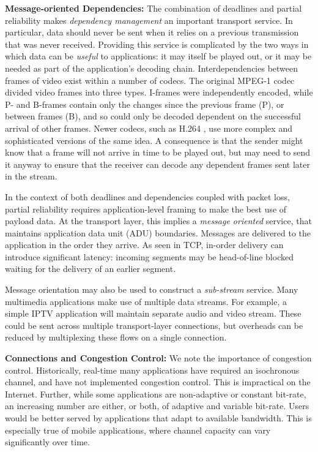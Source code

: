 \documentclass{sig-alternate-05-2015}
\begin{document}
\textbf{Message-oriented Dependencies:}
The combination of deadlines and partial reliability makes \emph{dependency
management} an important transport service.
In particular, data should never be sent when it relies on a previous
transmission that was never received. Providing this service is complicated by
the two ways in which data can be \emph{useful} to applications: it may itself
be played out, or it may be needed as part of the application's decoding chain.
Interdependencies between frames of video exist within a number of codecs.
The original MPEG-1 codec \cite{le1991mpeg} divided video frames into three
types. I-frames were independently encoded, while P- and B-frames contain
only the changes since the previous frame (P), or between frames (B), and so
could only be decoded dependent on the successful arrival of other frames.
Newer codecs, such as H.264 \cite{wiegand2003overview}, use more complex
and sophisticated versions of the same idea. 
A consequence is that the sender might know that a frame will not arrive in
time to be played out, but may need to send it anyway to ensure that the
receiver can decode any dependent frames sent later in the stream.

In the context of both deadlines and dependencies coupled with packet loss, partial reliability
requires application-level framing \cite{clark:1990:architecture} to
make the best use of payload data. At the transport
layer, this implies a \emph{message oriented} service, that
maintains application data unit (ADU) boundaries. Messages are delivered to
the application in the order they arrive. As seen in TCP, in-order delivery
can introduce significant latency: incoming segments may be head-of-line
blocked waiting for the delivery of an earlier segment.

Message orientation may also be used to construct a \emph{sub-stream} service.
Many multimedia applications make use of multiple data streams. For example, a
simple IPTV application will maintain separate audio and video stream. These
could be sent across multiple transport-layer connections, but overheads can be
reduced by multiplexing these flows on a single connection.

\textbf{Connections and Congestion Control:}
We note the importance of congestion control. Historically, real-time many
applications have required an isochronous channel, and have not implemented
congestion control. This is impractical on the Internet. Further, while
some applications are non-adaptive or constant bit-rate, an increasing
number are either, or both, of adaptive and variable bit-rate. Users would
be better served by applications that adapt to available bandwidth. This is
especially true of mobile applications, where channel capacity can vary
significantly over time.
\end{document}
